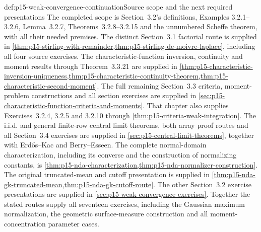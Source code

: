 \begin{proofboundary}{def:p15-weak-convergence-continuation}{Source scope and the next required presentations}
The completed scope is Section~3.2's definitions, Examples
3.2.1--3.2.6, Lemma~3.2.7, Theorems~3.2.8--3.2.15 and the
unnumbered Scheffe theorem, with all their needed premises.
The distinct Section~3.1 factorial route is supplied in
\cref{thm:p15-stirling-with-remainder,thm:p15-stirling-de-moivre-laplace},
including all four source exercises. The characteristic-function
inversion, continuity and moment results through Theorem~3.3.21 are
supplied in \cref{thm:p15-characteristic-inversion-uniqueness,thm:p15-characteristic-continuity-theorem,thm:p15-characteristic-second-moment}.
The full remaining Section~3.3 criteria, moment-problem constructions
and all section exercises are supplied in
\cref{sec:p15-characteristic-function-criteria-and-moments}.
That chapter also supplies Exercises~3.2.4, 3.2.5 and 3.2.10 through
\cref{thm:p15-criteria-weak-integration}.
The i.i.d. and general finite-row central limit theorems,
both array proof routes and all Section~3.4 exercises are supplied in
\cref{sec:p15-central-limit-theorems}, together with Erd\H{o}s--Kac
and Berry--Esseen. The complete normal-domain characterization,
including its converse and the construction of normalizing constants,
is \cref{thm:p15-nda-characterization,thm:p15-nda-normalizer-construction}.
The original truncated-mean and cutoff presentation is supplied in
\cref{thm:p15-nda-gk-truncated-mean,thm:p15-nda-gk-cutoff-route}.
The other Section~3.2 exercise presentations are supplied in
\cref{sec:p15-weak-convergence-exercises}. Together the stated
routes supply all seventeen exercises, including the Gaussian
maximum normalization, the geometric surface-measure construction
and all moment-concentration parameter cases.
\end{proofboundary}
